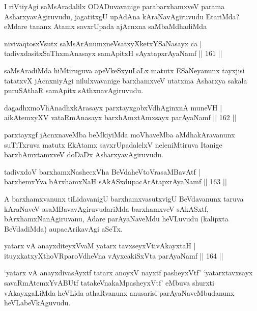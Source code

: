 \begin{artha}%
I riVtiyAgi saMsAradalilx ODADuvavanige parabarxhamxveV parama AsharxyavAgiruvudu, jagatitxgU upAdAna kAraNavAgiruvudu EtariMda? eMdare tananx Atamx savxrUpada ajAcnxna saMbaMdhadiMda
\end{artha}

\begin{shl}
nivivaqtosxVsutx saMsArAnumxneVsatxyXketxYSaNasayx ca |\\
tadivxdasitxSaThxmAnasayx samApitxH sAyxtapxrAyaNamf \hfill || 161 ||
\end{shl}

\begin{artha}
saMsAradiMda hiMtiruguva apeVkeSxyuLaLx matutx ESaNeyanunx tayxjisi tatatxvX jAcnxniyAgi nilulxvavanige barxhamxveV utatxma Asharxya sakala puruSAthaR samApitx sAthxnavAgiruvudu.
\end{artha}

\begin{shl}
dagadhxmoVhAnadhxkArasayx parxtayxgobxVdhAginxnA muneVH |\\
aikAtemxyXV vataRmAnasayx barxhAmxtAmx\s sayx parAyaNamf \hfill || 162 ||
\end{shl}

\begin{artha}
parxtayxgf jAcnxnaveMba beMkiyiMda moVhaveMba aMdhakAravanunx suTiTxruva matutx EkAtamx savxrUpadalelxV neleniMtiruva Itanige barxhAmxtamxveV doDaDx AsharxyavAgiruvudu.
\end{artha}

\begin{shl}
tadivxdoV barxhamxNashecxVha BeVdaheVtoVrasaMBavAtf |\\
barxhemxYva bArxhamxNaH sAkASxdupacArAtapxrAyaNamf \hfill || 163 ||
\end{shl}

\begin{artha}
A barxhamxvanunx tiLidavanigU barxhamxvasutxvigU BeVdavanunx taruva kAraNaveV asaMBavavAgiruvudariMda barxhamxveV sAkASxtf, bArxhamxNanAgiruvanu, Adare parAyaNaveMdu heVLuvudu (kalipxta BeVdadiMda) aupacArikavAgi aSeTx.
\end{artha}

\begin{shl}
yatarx vA anayxditeyxVvaM yatarx tavxseyxVtivAkayxtaH |\\
ituyxkatxyXthoVRparoVdheVna vAyxcakiSxVta parAyaNamf \hfill || 164 ||
\end{shl}

\begin{artha}%
`yatarx vA anayxdivasAyxtf tatarx anoyxV nayxtf pasheyxVtf' `yatarxtavxsayx savaRmAtemxYvABUtf tatakeVnakaMpasheyxVtf' eMbuva shurxti vAkayxgaLiMda heVLida athaRvanunx anusarisi parAyaNaveMbudanunx heVLabeVkAguvudu.
\end{artha}

